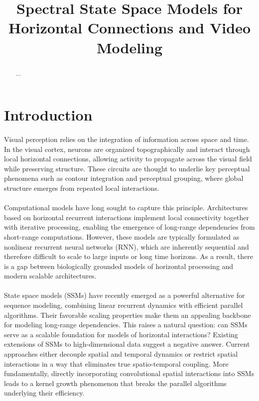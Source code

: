 \documentclass{article}
\title{Spectral State Space Models for Horizontal Connections and Video Modeling}
\author{}
\begin{document}
\doparttoc %
\faketableofcontents %

\maketitle

\begin{abstract}
...
\end{abstract}

\section{Introduction}


\paragraph{}Visual perception relies on the integration of information across space and time. In the visual cortex, neurons are organized topographically and interact through local horizontal connections, allowing activity to propagate across the visual field while preserving structure. These circuits are thought to underlie key perceptual phenomena such as contour integration and perceptual grouping, where global structure emerges from repeated local interactions.

\paragraph{}Computational models have long sought to capture this principle. Architectures based on horizontal recurrent interactions implement local connectivity together with iterative processing, enabling the emergence of long-range dependencies from short-range computations. However, these models are typically formulated as nonlinear recurrent neural networks (RNN), which are inherently sequential and therefore difficult to scale to large inputs or long time horizons. As a result, there is a gap between biologically grounded models of horizontal processing and modern scalable architectures.

\paragraph{}State space models (SSMs) have recently emerged as a powerful alternative for sequence modeling, combining linear recurrent dynamics with efficient parallel algorithms. Their favorable scaling properties make them an appealing backbone for modeling long-range dependencies. This raises a natural question: can SSMs serve as a scalable foundation for models of horizontal interactions? Existing extensions of SSMs to high-dimensional data suggest a negative answer. Current approaches either decouple spatial and temporal dynamics or restrict spatial interactions in a way that eliminates true spatio-temporal coupling. More fundamentally, directly incorporating convolutional spatial interactions into SSMs leads to a kernel growth phenomenon that breaks the parallel algorithms underlying their efficiency.
\end{document}

